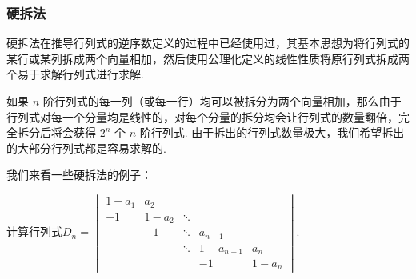 \subsubsection{硬拆法}

硬拆法在推导行列式的逆序数定义的过程中已经使用过，其基本思想为将行列式的某行或某列拆成两个向量相加，然后使用公理化定义的线性性质将原行列式拆成两个易于求解行列式进行求解.

如果 $n$ 阶行列式的每一列（或每一行）均可以被拆分为两个向量相加，那么由于行列式对每一个分量均是线性的，对每个分量的拆分均会让行列式的数量翻倍，完全拆分后将会获得 $2^n$ 个 $n$ 阶行列式. 由于拆出的行列式数量极大，我们希望拆出的大部分行列式都是容易求解的.

我们来看一些硬拆法的例子：

\begin{example}{}{}
    计算行列式$D_n=\begin{vmatrix}
            1-a_{1} & a_{2}   &        &           &         \\
            -1      & 1-a_{2} & \ddots &           &         \\
                    & -1      & \ddots & a_{n-1}   &         \\
                    &         & \ddots & 1-a_{n-1} & a_{n}   \\
                    &         &        & -1        & 1-a_{n}
        \end{vmatrix}$.
\end{example}

